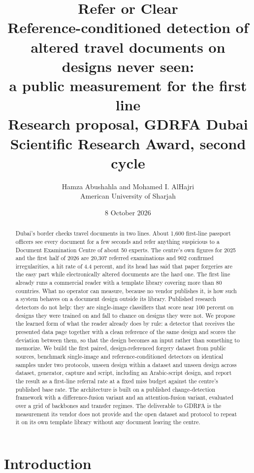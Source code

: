 \documentclass[11pt,a4paper]{article}
\title{Refer or Clear\\[6pt]
\large Reference-conditioned detection of altered travel documents on designs never seen:\\ a public measurement for the first line\\[4pt] \normalsize Research proposal, GDRFA Dubai Scientific Research Award, second cycle}
\author{Hamza Abushahla and Mohamed I. AlHajri\\ \small American University of Sharjah}
\date{8 October 2026}
\begin{document}
\maketitle

\begin{abstract}
\noindent Dubai's border checks travel documents in two lines. About 1,600 first-line passport officers see every document for a few seconds and refer anything suspicious to a Document Examination Centre of about 50 experts. The centre's own figures for 2025 and the first half of 2026 are 20,307 referred examinations and 902 confirmed irregularities, a hit rate of 4.4 percent, and its head has said that paper forgeries are the easy part while electronically altered documents are the hard one. The first line already runs a commercial reader with a template library covering more than 80 countries. What no operator can measure, because no vendor publishes it, is how such a system behaves on a document design outside its library. Published research detectors do not help: they are single-image classifiers that score near 100 percent on designs they were trained on and fall to chance on designs they were not. We propose the learned form of what the reader already does by rule: a detector that receives the presented data page together with a clean reference of the same design and scores the deviation between them, so that the design becomes an input rather than something to memorize. We build the first paired, design-referenced forgery dataset from public sources, benchmark single-image and reference-conditioned detectors on identical samples under two protocols, unseen design within a dataset and unseen design across dataset, generator, capture and script, including an Arabic-script design, and report the result as a first-line referral rate at a fixed miss budget against the centre's published base rate. The architecture is built on a published change-detection framework with a difference-fusion variant and an attention-fusion variant, evaluated over a grid of backbones and transfer regimes. The deliverable to GDRFA is the measurement its vendor does not provide and the open dataset and protocol to repeat it on its own template library without any document leaving the centre.
\end{abstract}

\section{Introduction}
\label{sec:problem}
\end{document}
